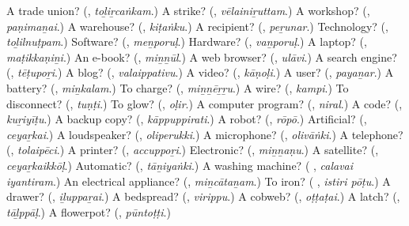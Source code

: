 \begin{tcolorbox}[breakable,colback=teal!4,colframe=teal!35!black,title={Before you move on}]
A trade union? (\textbf{}, \emph{toḻiṟcaṅkam}.) A strike? (\textbf{}, \emph{vēlainiṟuttam}.) A workshop? (\textbf{}, \emph{paṇimaṉai}.) A warehouse? (\textbf{}, \emph{kiṭaṅku}.) A recipient? (\textbf{}, \emph{peṟunar}.) Technology? (\textbf{}, \emph{toḻilnuṭpam}.) Software? (\textbf{}, \emph{meṉporuḷ}.) Hardware? (\textbf{}, \emph{vaṉporuḷ}.) A laptop? (\textbf{}, \emph{maṭikkaṇiṉi}.) An e-book? (\textbf{}, \emph{miṉṉūl}.) A web browser? (\textbf{}, \emph{ulāvi}.) A search engine? (\textbf{}, \emph{tēṭupoṟi}.) A blog? (\textbf{}, \emph{valaippativu}.) A video? (\textbf{}, \emph{kāṇoḷi}.) A user? (\textbf{}, \emph{payaṉar}.) A battery? (\textbf{}, \emph{miṉkalam}.) To charge? (\textbf{}, \emph{miṉṉēṟṟu}.) A wire? (\textbf{}, \emph{kampi}.) To disconnect? (\textbf{}, \emph{tuṇṭi}.) To glow? (\textbf{}, \emph{oḷir}.) A computer program? (\textbf{}, \emph{niral}.) A code? (\textbf{}, \emph{kuṟiyīṭu}.) A backup copy? (\textbf{}, \emph{kāppuppirati}.) A robot? (\textbf{}, \emph{rōpō}.) Artificial? (\textbf{}, \emph{ceyaṟkai}.) A loudspeaker? (\textbf{}, \emph{oliperukki}.) A microphone? (\textbf{}, \emph{olivāṅki}.) A telephone? (\textbf{}, \emph{tolaipēci}.) A printer? (\textbf{}, \emph{accuppoṟi}.) Electronic? (\textbf{}, \emph{miṉṉaṇu}.) A satellite? (\textbf{}, \emph{ceyaṟkaikkōḷ}.) Automatic? (\textbf{}, \emph{tāṉiyaṅki}.) A washing machine? (\textbf{ }, \emph{calavai iyantiram}.) An electrical appliance? (\textbf{}, \emph{miṉcātaṉam}.) To iron? (\textbf{ }, \emph{istiri pōṭu}.) A drawer? (\textbf{}, \emph{iḻuppaṟai}.) A bedspread? (\textbf{}, \emph{virippu}.) A cobweb? (\textbf{}, \emph{oṭṭaṭai}.) A latch? (\textbf{}, \emph{tāḻppāḷ}.) A flowerpot? (\textbf{}, \emph{pūntoṭṭi}.)
\end{tcolorbox}
